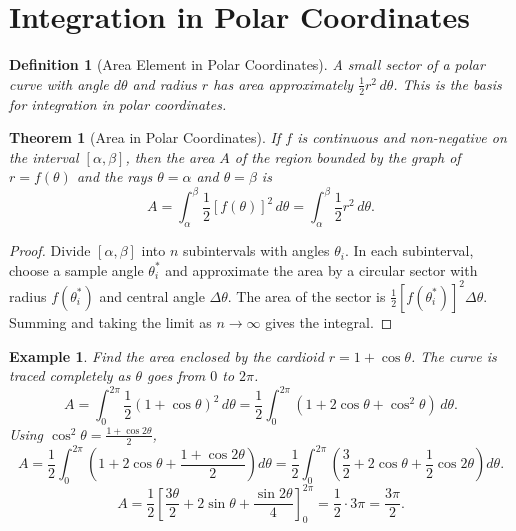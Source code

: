 \documentclass[11pt,a4paper]{article}
\newtheorem{example}{Example}
\newtheorem{theorem}{Theorem}
\newtheorem{definition}{Definition}
\begin{document}
\section{Integration in Polar Coordinates}
\begin{definition}[Area Element in Polar Coordinates]
A small sector of a polar curve with angle $d\theta$ and radius $r$ has area approximately $\frac{1}{2} r^2 \, d\theta$. This is the basis for integration in polar coordinates.
\end{definition}
\begin{theorem}[Area in Polar Coordinates]
If $f$ is continuous and non-negative on the interval $[\alpha, \beta]$, then the area $A$ of the region bounded by the graph of $r = f(\theta)$ and the rays $\theta = \alpha$ and $\theta = \beta$ is
\[
A = \int_{\alpha}^{\beta} \frac{1}{2} [f(\theta)]^2 \, d\theta = \int_{\alpha}^{\beta} \frac{1}{2} r^2 \, d\theta.
\]
\end{theorem}
\begin{proof}
Divide $[\alpha, \beta]$ into $n$ subintervals with angles $\theta_i$. In each subinterval, choose a sample angle $\theta_i^*$ and approximate the area by a circular sector with radius $f(\theta_i^*)$ and central angle $\Delta \theta$. The area of the sector is $\frac{1}{2} [f(\theta_i^*)]^2 \Delta \theta$. Summing and taking the limit as $n \to \infty$ gives the integral.
\end{proof}
\begin{center}
\end{center}
\begin{example}
Find the area enclosed by the cardioid $r = 1 + \cos \theta$.
The curve is traced completely as $\theta$ goes from $0$ to $2\pi$.
\[
A = \int_0^{2\pi} \frac{1}{2} (1 + \cos \theta)^2 \, d\theta = \frac{1}{2} \int_0^{2\pi} (1 + 2\cos \theta + \cos^2 \theta) \, d\theta.
\]
Using $\cos^2 \theta = \frac{1 + \cos 2\theta}{2}$,
\[
A = \frac{1}{2} \int_0^{2\pi} \left( 1 + 2\cos \theta + \frac{1 + \cos 2\theta}{2} \right) d\theta = \frac{1}{2} \int_0^{2\pi} \left( \frac{3}{2} + 2\cos \theta + \frac{1}{2}\cos 2\theta \right) d\theta.
\]
\[
A = \frac{1}{2} \left[ \frac{3\theta}{2} + 2\sin \theta + \frac{\sin 2\theta}{4} \right]_0^{2\pi} = \frac{1}{2} \cdot 3\pi = \frac{3\pi}{2}.
\]
\end{example}
\end{document}
